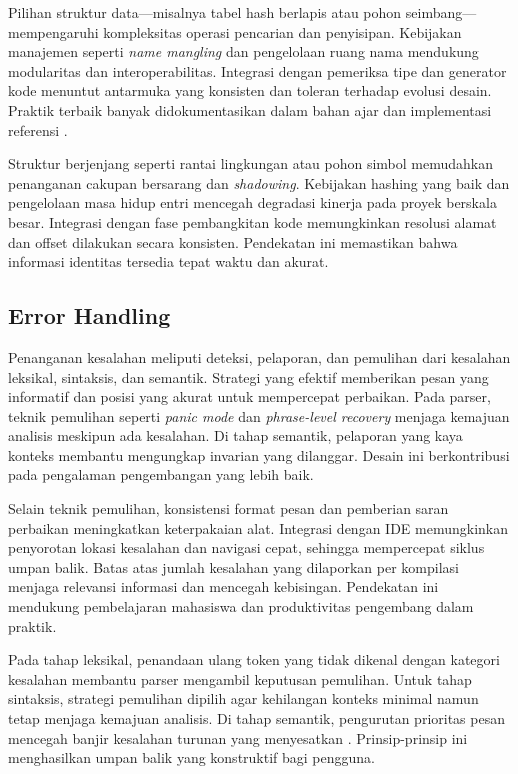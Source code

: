 \documentclass[../main.tex]{subfiles}
\begin{document}
Pilihan struktur data—misalnya tabel hash berlapis atau pohon seimbang—mempengaruhi kompleksitas operasi pencarian dan penyisipan. Kebijakan manajemen seperti \emph{name mangling} dan pengelolaan ruang nama mendukung modularitas dan interoperabilitas. Integrasi dengan pemeriksa tipe dan generator kode menuntut antarmuka yang konsisten dan toleran terhadap evolusi desain. Praktik terbaik banyak didokumentasikan dalam bahan ajar dan implementasi referensi \citep{CS143}.

Struktur berjenjang seperti rantai lingkungan atau pohon simbol memudahkan penanganan cakupan bersarang dan \emph{shadowing}. Kebijakan hashing yang baik dan pengelolaan masa hidup entri mencegah degradasi kinerja pada proyek berskala besar. Integrasi dengan fase pembangkitan kode memungkinkan resolusi alamat dan offset dilakukan secara konsisten. Pendekatan ini memastikan bahwa informasi identitas tersedia tepat waktu dan akurat.

\subsection{Error Handling}
Penanganan kesalahan meliputi deteksi, pelaporan, dan pemulihan dari kesalahan leksikal, sintaksis, dan semantik. Strategi yang efektif memberikan pesan yang informatif dan posisi yang akurat untuk mempercepat perbaikan. Pada parser, teknik pemulihan seperti \emph{panic mode} dan \emph{phrase-level recovery} menjaga kemajuan analisis meskipun ada kesalahan. Di tahap semantik, pelaporan yang kaya konteks membantu mengungkap invarian yang dilanggar. Desain ini berkontribusi pada pengalaman pengembangan yang lebih baik.

Selain teknik pemulihan, konsistensi format pesan dan pemberian saran perbaikan meningkatkan keterpakaian alat. Integrasi dengan IDE memungkinkan penyorotan lokasi kesalahan dan navigasi cepat, sehingga mempercepat siklus umpan balik. Batas atas jumlah kesalahan yang dilaporkan per kompilasi menjaga relevansi informasi dan mencegah kebisingan. Pendekatan ini mendukung pembelajaran mahasiswa dan produktivitas pengembang dalam praktik.

Pada tahap leksikal, penandaan ulang token yang tidak dikenal dengan kategori kesalahan membantu parser mengambil keputusan pemulihan. Untuk tahap sintaksis, strategi pemulihan dipilih agar kehilangan konteks minimal namun tetap menjaga kemajuan analisis. Di tahap semantik, pengurutan prioritas pesan mencegah banjir kesalahan turunan yang menyesatkan \citep{Mogensen2010}. Prinsip-prinsip ini menghasilkan umpan balik yang konstruktif bagi pengguna.
\end{document}
